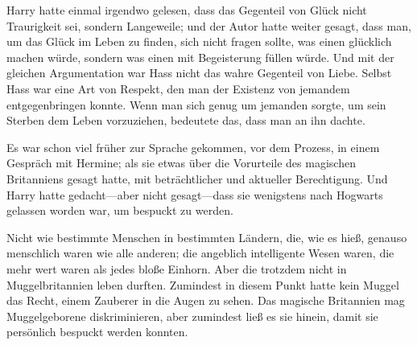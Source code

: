 Harry hatte einmal irgendwo gelesen, dass das Gegenteil von Glück nicht Traurigkeit sei, sondern Langeweile; und der Autor hatte weiter gesagt, dass man, um das Glück im Leben zu finden, sich nicht fragen sollte, was einen glücklich machen würde, sondern was einen mit Begeisterung füllen würde. Und mit der gleichen Argumentation war Hass nicht das wahre Gegenteil von Liebe. Selbst Hass war eine Art von Respekt, den man der Existenz von jemandem entgegenbringen konnte. Wenn man sich genug um jemanden sorgte, um sein Sterben dem Leben vorzuziehen, bedeutete das, dass man an ihn dachte.

Es war schon viel früher zur Sprache gekommen, vor dem Prozess, in einem Gespräch mit Hermine; als sie etwas über die Vorurteile des magischen Britanniens gesagt hatte, mit beträchtlicher und aktueller Berechtigung. Und Harry hatte gedacht—aber nicht gesagt—dass sie wenigstens nach Hogwarts gelassen worden war, um bespuckt zu werden.

Nicht wie bestimmte Menschen in bestimmten Ländern, die, wie es hieß, genauso menschlich waren wie alle anderen; die angeblich intelligente Wesen waren, die mehr wert waren als jedes bloße Einhorn.
Aber die trotzdem nicht in Muggelbritannien leben durften.
Zumindest in diesem Punkt hatte kein Muggel das Recht, einem Zauberer in die Augen zu sehen. Das magische Britannien mag Muggelgeborene diskriminieren, aber zumindest ließ es sie hinein, damit sie persönlich bespuckt werden konnten.

